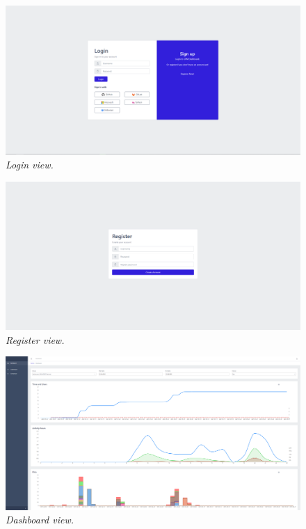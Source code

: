 \begin{figure}[ht]
    \centering
    \includegraphics[width=1\textwidth]{figures/views/login}
    \caption{\textit{Login view.}}
    \label{fig:login}
\end{figure}

\begin{figure}[ht]
    \centering
    \includegraphics[width=1\textwidth]{figures/views/register}
    \caption{\textit{Register view.}}
    \label{fig:register}
\end{figure}

\begin{figure}[ht]
    \centering
    \includegraphics[width=1\textwidth]{figures/views/dashboard}
    \caption{\textit{Dashboard view.}}
    \label{fig:dashboard}
\end{figure}

